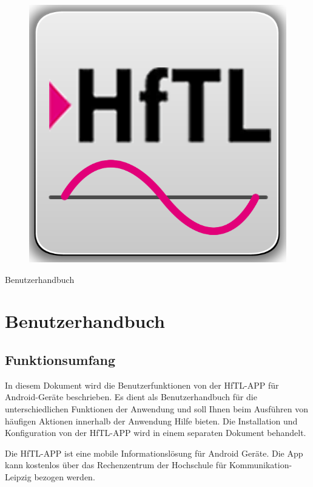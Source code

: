 \begin{figure}[h]
	\centering
	\includegraphics[scale=2.5]{03_Bedienungsanleitung/img/Logo_HFTl_App.png}
	\label{img:grafik-dummy}
\end{figure}

\begin{center}
{\huge Benutzerhandbuch}
\end{center}


\newpage
\section{Benutzerhandbuch}
\subsection{Funktionsumfang}
In diesem Dokument wird die Benutzerfunktionen von der HfTL-APP für
Android-Geräte beschrieben. Es dient als Benutzerhandbuch für die
unterschiedlichen Funktionen der Anwendung und soll Ihnen beim
Ausführen von häufigen Aktionen innerhalb der Anwendung Hilfe bieten.
Die Installation und Konfiguration von der HfTL-APP wird in einem
separaten Dokument behandelt.

Die HfTL-APP ist eine mobile Informationslösung für Android Geräte. Die App kann kostenlos über das Rechenzentrum der Hochschule für Kommunikation-Leipzig bezogen werden.

